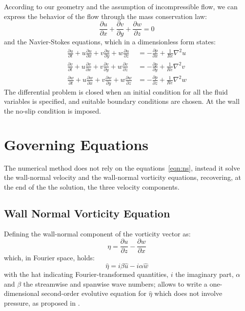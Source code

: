 According to our geometry and the assumption of incompressible flow, we can express the behavior of the flow through the mass conservation law:
\begin{equation}
\frac{\partial u}{\partial x} + \frac{\partial v}{\partial y} + \frac{\partial w}{\partial z} = 0
\label{mass:cons}
\end{equation}
 and the Navier-Stokes equations, which in a dimensionless form states:
\begin{subequations}
\label{eqn:ns}
\begin{align}
\frac{\partial u}{\partial t} + u\frac{\partial u}{\partial x} + v\frac{\partial u}{\partial y} + w\frac{\partial u}{\partial z} &= 
- \frac{\partial p}{\partial x} + \frac{1}{Re} \nabla^{2}u  \label{eqn:ns:1}\\
\frac{\partial v}{\partial t} + u\frac{\partial v}{\partial x} + v\frac{\partial v}{\partial y} + w\frac{\partial v}{\partial z} &= 
- \frac{\partial p}{\partial y} + \frac{1}{Re}\nabla^{2}v \label{eqn:ns:2}\\
\frac{\partial w}{\partial t} + u\frac{\partial w}{\partial x} + v\frac{\partial w}{\partial y} + w\frac{\partial w}{\partial z} &= 
- \frac{\partial p}{\partial z} + \frac{1}{Re}\nabla^{2}w \label{eqn:ns:3}
\end{align}
\end{subequations}
The differential problem is closed when an initial condition for all the fluid variables is specified, and suitable boundary conditions are chosen. At the wall the no-slip condition is imposed.








\section{Governing Equations}
The numerical method does not rely on the equations~\eqref{eqn:ns}, instead it solve the wall-normal velocity and the wall-normal vorticity equations, recovering, at the end of the the solution, the three velocity components.\\
\subsection{Wall Normal Vorticity Equation}
Defining the wall-normal component of the vorticity vector as:
\[
\eta = \frac{\partial u}{\partial z} - \frac{\partial w}{\partial x}
\]
which, in Fourier space, holds:
\[
\hat{\eta} = i\beta \hat{u} - i \alpha \hat{w}
\] 
with the hat indicating Fourier-transformed quantities, $i$ the imaginary part, $\alpha$ and $\beta$ the streamwise and spanwise wave numbers;  allows to write a one-dimensional second-order evolutive equation for $\hat{\eta}$ which does not involve pressure, as proposed in \cite{kim_moin_moser}.

